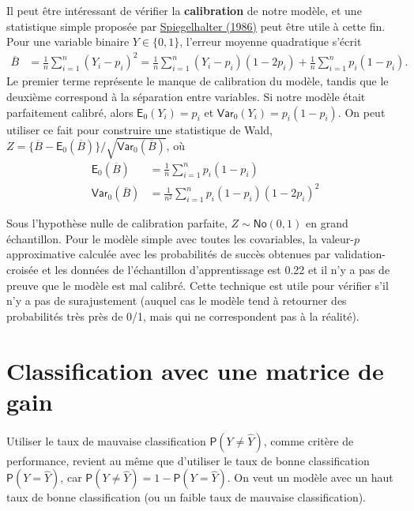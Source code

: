 \documentclass[
  11pt,
  letterpaper,
]{book}
\theoremstyle{definition}
\theoremstyle{definition}
\theoremstyle{definition}
\theoremstyle{remark}
\begin{document}
Il peut être intéressant de vérifier la \textbf{calibration} de notre modèle, et une statistique simple proposée par \href{https://doi.org/10.1002/sim.4780050506}{Spiegelhalter (1986)} peut être utile à cette fin. Pour une variable binaire \(Y \in \{0,1\}\), l'erreur moyenne quadratique s'écrit
\begin{align*}
\overline{B} &= \frac{1}{n} \sum_{i=1}^n (Y_i-p_i)^2 
=\frac{1}{n} \sum_{i=1}^n(Y_i-p_i)(1-2p_i) + \frac{1}{n} \sum_{i=1}^n p_i(1-p_i).
\end{align*}
Le premier terme représente le manque de calibration du modèle, tandis que le deuxième correspond à la séparation entre variables. Si notre modèle était parfaitement calibré, alors \(\mathsf{E}_0(Y_i)=p_i\) et \(\mathsf{Var}_0(Y_i) = p_i(1-p_i)\). On peut utiliser ce fait pour construire une statistique de Wald, \(Z = \{\overline{B} - \mathsf{E}_0(\overline{B})\}/\sqrt{\mathsf{Var}_0(\overline{B})}\), où
\begin{align*}
\mathsf{E}_0(\overline{B})&= \frac{1}{n} \sum_{i=1}^n p_i(1-p_i) \\
\mathsf{Var}_0(\overline{B})&= \frac{1}{n^2} \sum_{i=1}^n p_i(1-p_i)(1-2p_i)^2
\end{align*}

Sous l'hypothèse nulle de calibration parfaite, \(Z \sim \mathsf{No}(0,1)\) en grand échantillon. Pour le modèle simple avec toutes les covariables, la valeur-\(p\) approximative calculée avec les probabilités de succès obtenues par validation-croisée et les données de l'échantillon d'apprentissage est 0.22 et il n'y a pas de preuve que le modèle est mal calibré. Cette technique est utile pour vérifier s'il n'y a pas de surajustement (auquel cas le modèle tend à retourner des probabilités très près de 0/1, mais qui ne correspondent pas à la réalité).

\hypertarget{classification-avec-une-matrice-de-gain}{%
\section{Classification avec une matrice de gain}\label{classification-avec-une-matrice-de-gain}}

Utiliser le taux de mauvaise classification \({\mathsf P}\left(Y \neq \widehat{Y}\right)\), comme critère de performance, revient au même que d'utiliser le taux de bonne classification \({\mathsf P}\left(Y=\widehat{Y}\right)\), car \({\mathsf P}\left(Y \neq \widehat{Y}\right) = 1-{\mathsf P}\left(Y=\widehat{Y}\right)\). On veut un modèle avec un haut taux de bonne classification (ou un faible taux de mauvaise classification).
\end{document}
